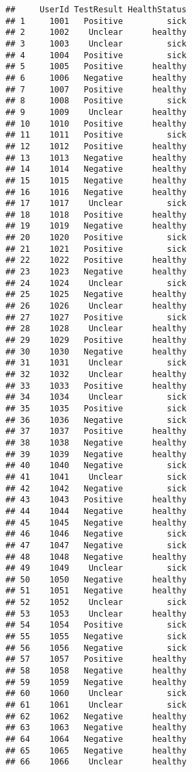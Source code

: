 \documentclass[
]{article}
\begin{document}
\begin{verbatim}
##     UserId TestResult HealthStatus
## 1     1001   Positive         sick
## 2     1002    Unclear      healthy
## 3     1003    Unclear         sick
## 4     1004   Positive         sick
## 5     1005   Positive      healthy
## 6     1006   Negative      healthy
## 7     1007   Positive      healthy
## 8     1008   Positive         sick
## 9     1009    Unclear      healthy
## 10    1010   Positive      healthy
## 11    1011   Positive         sick
## 12    1012   Positive      healthy
## 13    1013   Negative      healthy
## 14    1014   Negative      healthy
## 15    1015   Negative      healthy
## 16    1016   Negative      healthy
## 17    1017    Unclear         sick
## 18    1018   Positive      healthy
## 19    1019   Negative      healthy
## 20    1020   Positive         sick
## 21    1021   Positive         sick
## 22    1022   Positive      healthy
## 23    1023   Negative      healthy
## 24    1024    Unclear         sick
## 25    1025   Negative      healthy
## 26    1026    Unclear      healthy
## 27    1027   Positive         sick
## 28    1028    Unclear      healthy
## 29    1029   Positive      healthy
## 30    1030   Negative      healthy
## 31    1031    Unclear         sick
## 32    1032    Unclear      healthy
## 33    1033   Positive      healthy
## 34    1034    Unclear         sick
## 35    1035   Positive         sick
## 36    1036   Negative         sick
## 37    1037   Positive      healthy
## 38    1038   Negative      healthy
## 39    1039   Negative      healthy
## 40    1040   Negative         sick
## 41    1041    Unclear         sick
## 42    1042   Negative         sick
## 43    1043   Positive      healthy
## 44    1044   Negative      healthy
## 45    1045   Negative      healthy
## 46    1046   Negative         sick
## 47    1047   Negative         sick
## 48    1048   Negative      healthy
## 49    1049    Unclear         sick
## 50    1050   Negative      healthy
## 51    1051   Negative      healthy
## 52    1052    Unclear         sick
## 53    1053    Unclear      healthy
## 54    1054   Positive         sick
## 55    1055   Negative         sick
## 56    1056   Negative         sick
## 57    1057   Positive      healthy
## 58    1058   Negative      healthy
## 59    1059   Negative      healthy
## 60    1060    Unclear         sick
## 61    1061    Unclear         sick
## 62    1062   Negative      healthy
## 63    1063   Negative      healthy
## 64    1064   Negative      healthy
## 65    1065   Negative      healthy
## 66    1066    Unclear      healthy

\end{verbatim}
\end{document}
